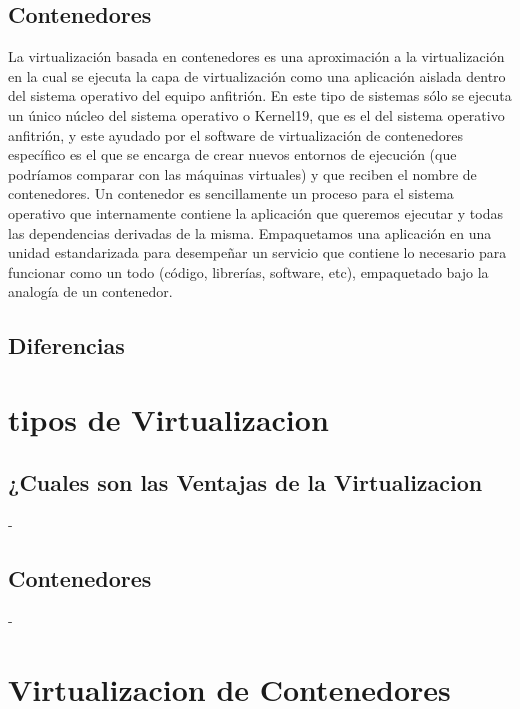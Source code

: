 \documentclass[%
 reprint,
 amsmath,amssymb,
 aps,
]{revtex4-1}
\begin{document}
\subsection{Contenedores}
La virtualización basada en contenedores es una aproximación a la virtualización en la cual se
ejecuta la capa de virtualización como una aplicación aislada dentro del sistema operativo del
equipo anfitrión. En este tipo de sistemas sólo se ejecuta un único núcleo del sistema operativo o
Kernel19, que es el del sistema operativo anfitrión, y este ayudado por el software de virtualización
de contenedores específico es el que se encarga de crear nuevos entornos de ejecución (que
podríamos comparar con las máquinas virtuales) y que reciben el nombre de contenedores.
Un contenedor es sencillamente un proceso para el sistema operativo que internamente contiene
la aplicación que queremos ejecutar y todas las dependencias derivadas de la misma.
Empaquetamos una aplicación en una unidad estandarizada para desempeñar un servicio que
contiene lo necesario para funcionar como un todo (código, librerías, software, etc), empaquetado
bajo la analogía de un contenedor.

\subsection{Diferencias}


\section{tipos de Virtualizacion}\label{sec:4}
\subsection{¿Cuales son las Ventajas de la Virtualizacion}
-  
\subsection{Contenedores}
- 

\section {Virtualizacion de Contenedores}\label{sec:5}
\end{document}
